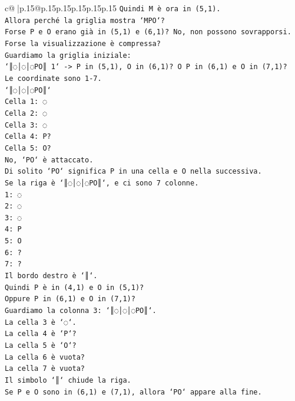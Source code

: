 \documentclass{article}
\begin{document}
{\begin{supertabular}{c@{$\;$}|p{.15\linewidth}@{}p{.15\linewidth}p{.15\linewidth}p{.15\linewidth}p{.15\linewidth}p{.15\linewidth}}
{{{\texttt{Quindi M è ora in (5,1).} \\
\texttt{Allora perché la griglia mostra `MPO`?} \\
\texttt{Forse P e O erano già in (5,1) e (6,1)? No, non possono sovrapporsi.} \\
\texttt{Forse la visualizzazione è compressa?} \\
\texttt{Guardiamo la griglia iniziale:} \\
\texttt{`║◌│◌│◌PO║ 1` {-}> P in (5,1), O in (6,1)? O P in (6,1) e O in (7,1)?} \\
\texttt{Le coordinate sono 1{-}7.} \\
\texttt{`║◌│◌│◌PO║`} \\
\texttt{Cella 1: ◌} \\
\texttt{Cella 2: ◌} \\
\texttt{Cella 3: ◌} \\
\texttt{Cella 4: P?} \\
\texttt{Cella 5: O?} \\
\texttt{No, `PO` è attaccato.} \\
\texttt{Di solito `PO` significa P in una cella e O nella successiva.} \\
\texttt{Se la riga è `║◌│◌│◌PO║`, e ci sono 7 colonne.} \\
\texttt{1: ◌} \\
\texttt{2: ◌} \\
\texttt{3: ◌} \\
\texttt{4: P} \\
\texttt{5: O} \\
\texttt{6: ?} \\
\texttt{7: ?} \\
\texttt{Il bordo destro è `║`.} \\
\texttt{Quindi P è in (4,1) e O in (5,1)?} \\
\texttt{Oppure P in (6,1) e O in (7,1)?} \\
\texttt{Guardiamo la colonna 3: `║◌│◌│◌PO║`.} \\
\texttt{La cella 3 è `◌`.} \\
\texttt{La cella 4 è `P`?} \\
\texttt{La cella 5 è `O`?} \\
\texttt{La cella 6 è vuota?} \\
\texttt{La cella 7 è vuota?} \\
\texttt{Il simbolo `║` chiude la riga.} \\
\texttt{Se P e O sono in (6,1) e (7,1), allora `PO` appare alla fine.} \\
}}}
\end{supertabular}}
\end{document}
